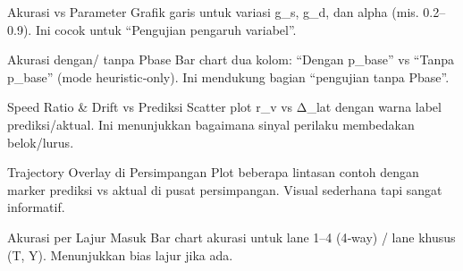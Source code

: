\documentclass[conference]{IEEEtran}
\begin{document}
Akurasi vs Parameter
Grafik garis untuk variasi g_s, g_d, dan alpha (mis. 0.2–0.9).
Ini cocok untuk “Pengujian pengaruh variabel”.

Akurasi dengan/ tanpa Pbase
Bar chart dua kolom: “Dengan p_base” vs “Tanpa p_base” (mode heuristic‑only).
Ini mendukung bagian “pengujian tanpa Pbase”.

Speed Ratio & Drift vs Prediksi
Scatter plot r_v vs Δ_lat dengan warna label prediksi/aktual.
Ini menunjukkan bagaimana sinyal perilaku membedakan belok/lurus.

Trajectory Overlay di Persimpangan
Plot beberapa lintasan contoh dengan marker prediksi vs aktual di pusat persimpangan.
Visual sederhana tapi sangat informatif.

Akurasi per Lajur Masuk
Bar chart akurasi untuk lane 1–4 (4‑way) / lane khusus (T, Y).
Menunjukkan bias lajur jika ada.
\end{document}
